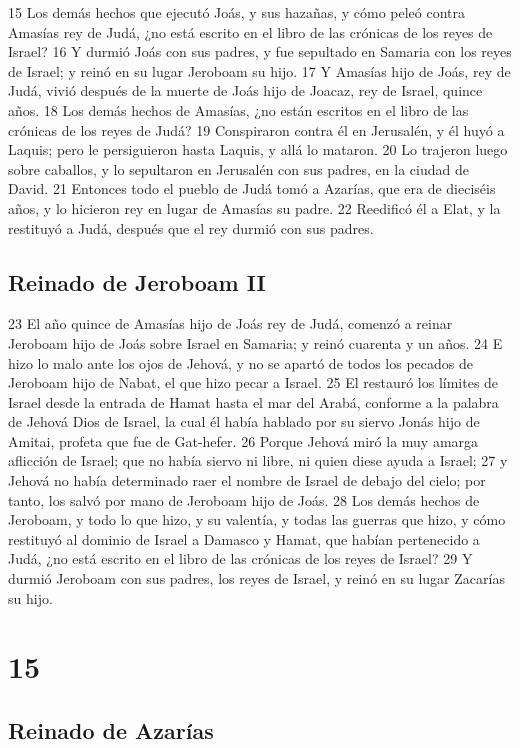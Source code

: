 15 Los demás hechos que ejecutó Joás, y sus hazañas, y cómo peleó contra Amasías rey de Judá, ¿no está escrito en el libro de las crónicas de los reyes de Israel?
16 Y durmió Joás con sus padres, y fue sepultado en Samaria con los reyes de Israel; y reinó en su lugar Jeroboam su hijo.
17 Y Amasías hijo de Joás, rey de Judá, vivió después de la muerte de Joás hijo de Joacaz, rey de Israel, quince años.
18 Los demás hechos de Amasías, ¿no están escritos en el libro de las crónicas de los reyes de Judá?
19 Conspiraron contra él en Jerusalén, y él huyó a Laquis; pero le persiguieron hasta Laquis, y allá lo mataron.
20 Lo trajeron luego sobre caballos, y lo sepultaron en Jerusalén con sus padres, en la ciudad de David.
21 Entonces todo el pueblo de Judá tomó a Azarías, que era de dieciséis años, y lo hicieron rey en lugar de Amasías su padre.
22 Reedificó él a Elat, y la restituyó a Judá, después que el rey durmió con sus padres.

\section*{Reinado de Jeroboam II}

23 El año quince de Amasías hijo de Joás rey de Judá, comenzó a reinar Jeroboam hijo de Joás sobre Israel en Samaria; y reinó cuarenta y un años.
24 E hizo lo malo ante los ojos de Jehová, y no se apartó de todos los pecados de Jeroboam hijo de Nabat, el que hizo pecar a Israel.
25 El restauró los límites de Israel desde la entrada de Hamat hasta el mar del Arabá, conforme a la palabra de Jehová Dios de Israel, la cual él había hablado por su siervo Jonás hijo de Amitai, profeta que fue de Gat-hefer.
26 Porque Jehová miró la muy amarga aflicción de Israel; que no había siervo ni libre, ni quien diese ayuda a Israel;
27 y Jehová no había determinado raer el nombre de Israel de debajo del cielo; por tanto, los salvó por mano de Jeroboam hijo de Joás.
28 Los demás hechos de Jeroboam, y todo lo que hizo, y su valentía, y todas las guerras que hizo, y cómo restituyó al dominio de Israel a Damasco y Hamat, que habían pertenecido a Judá, ¿no está escrito en el libro de las crónicas de los reyes de Israel?
29 Y durmió Jeroboam con sus padres, los reyes de Israel, y reinó en su lugar Zacarías su hijo.

\chapter{15}

\section*{Reinado de Azarías}

